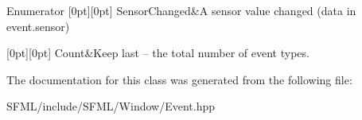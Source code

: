 \begin{DoxyEnumFields}{Enumerator}
[0pt][0pt]{}\mbox{\label{classsf_1_1_event_af41fa9ed45c02449030699f671331d4aaadf9a44c788eb9467a83c074fbf12613}} 
Sensor\+Changed&A sensor value changed (data in event.\+sensor) \\
\hline

[0pt][0pt]{}\mbox{\label{classsf_1_1_event_af41fa9ed45c02449030699f671331d4aae51749211243cab2ab270b29cdc32a70}} 
Count&Keep last -- the total number of event types. \\
\hline

\end{DoxyEnumFields}


The documentation for this class was generated from the following file\+:\begin{DoxyCompactItemize}
\item 
S\+F\+M\+L/include/\+S\+F\+M\+L/\+Window/Event.\+hpp\end{DoxyCompactItemize}
